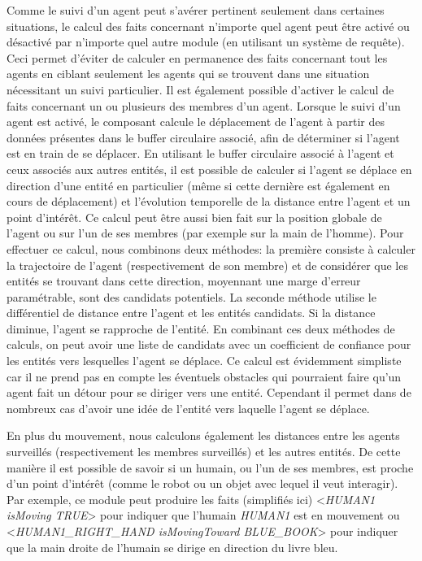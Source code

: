 \documentclass[a4paper,11pt,twoside]{StyleThese}
\begin{document}
Comme le suivi d'un agent peut s'avérer pertinent seulement dans certaines situations, le calcul des faits concernant n'importe quel agent peut être activé ou désactivé par n'importe quel autre module (en utilisant un système de requête). Ceci permet d'éviter de calculer en permanence des faits concernant tout les agents en ciblant seulement les agents qui se trouvent dans une situation nécessitant un suivi particulier.
Il est également possible d'activer le calcul de faits concernant un ou plusieurs des membres d'un agent. Lorsque le suivi d'un agent est activé, le composant calcule le déplacement de l'agent à partir des données présentes dans le buffer circulaire associé, afin de déterminer si l'agent est en train de se déplacer. En utilisant le buffer circulaire associé à l'agent et ceux associés aux autres entités, il est possible de calculer si l'agent se déplace en direction d'une entité en particulier (même si cette dernière est également en cours de déplacement) et l'évolution temporelle de la distance entre l'agent et un point d'intérêt. Ce calcul peut être aussi bien fait sur la position globale de l'agent ou sur l'un de ses membres (par exemple sur la main de l'homme).
Pour effectuer ce calcul, nous combinons deux méthodes: la première consiste à calculer la trajectoire de l'agent (respectivement de son membre) et de considérer que les entités se trouvant dans cette direction, moyennant une marge d'erreur paramétrable, sont des candidats potentiels. La seconde méthode utilise le différentiel de distance entre l'agent et les entités candidats. Si la distance diminue, l'agent se rapproche de l'entité. En combinant ces deux méthodes de calculs, on peut avoir une liste de candidats avec un coefficient de confiance pour les entités vers lesquelles l'agent se déplace. Ce calcul est évidemment simpliste car il ne prend pas en compte les éventuels obstacles qui pourraient faire qu'un agent fait un détour pour se diriger vers une entité. Cependant il permet dans de nombreux cas d'avoir une idée de l'entité vers laquelle l'agent se déplace.

En plus du mouvement, nous calculons également les distances entre les agents surveillés (respectivement les membres surveillés) et les autres entités.
De cette manière il est possible de savoir si un humain, ou l'un de ses membres, est proche d'un point d'intérêt (comme le robot ou un objet avec lequel il veut interagir).
Par exemple, ce module peut produire les faits (simplifiés ici) <\textit{HUMAN1 isMoving TRUE}> pour indiquer que l'humain \textit{HUMAN1} est en mouvement ou <\textit{HUMAN1\_RIGHT\_HAND isMovingToward BLUE\_BOOK}> pour indiquer que la main droite de l'humain se dirige en direction du livre bleu.
\end{document}
